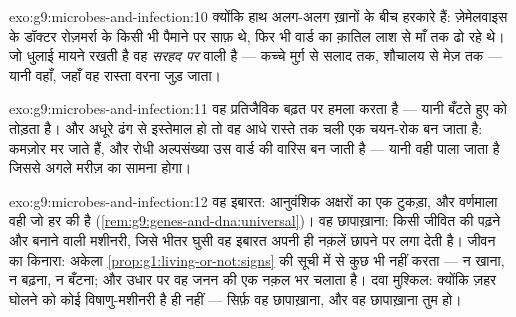 \begin{solution}{exo:g9:microbes-and-infection:10}
क्योंकि हाथ अलग-अलग ख़ानों के बीच हरकारे हैं: ज़ेमेलवाइस के डॉक्टर
रोज़मर्रा के किसी भी पैमाने पर साफ़ थे, फिर भी वार्ड का क़ातिल लाश से
माँ तक ढो रहे थे। जो धुलाई मायने रखती है वह \emph{सरहद पर} वाली है ---
कच्चे मुर्ग़ से सलाद तक, शौचालय से मेज़ तक --- यानी वहाँ, जहाँ वह रास्ता
वरना जुड़ जाता।
\end{solution}

\begin{solution}{exo:g9:microbes-and-infection:11}
वह प्रतिजैविक बढ़त पर हमला करता है --- यानी बँटते हुए  को तोड़ता
है। और अधूरे ढंग से इस्तेमाल हो तो वह आधे रास्ते तक चली एक चयन-रोक बन
जाता है: कमज़ोर मर जाते हैं, और रोधी अल्पसंख्या उस वार्ड की वारिस बन
जाती है --- यानी वही  पाला जाता है जिससे अगले मरीज़ का सामना होगा।
\end{solution}

\begin{solution}{exo:g9:microbes-and-infection:12}
वह इबारत: आनुवंशिक अक्षरों का एक टुकड़ा, और वर्णमाला वही जो हर  की
है (\cref{rem:g9:genes-and-dna:universal})। वह छापाख़ाना: किसी जीवित
 की पढ़ने और बनाने वाली मशीनरी, जिसे भीतर घुसी वह इबारत अपनी ही
नक़लें छापने पर लगा देती है। जीवन का किनारा: अकेला 
\cref{prop:g1:living-or-not:signs} की सूची में से कुछ भी नहीं करता ---
न खाना, न बढ़ना, न बँटना; और उधार पर वह जनन की एक नक़ल भर चलाता है। दवा
मुश्किल: क्योंकि ज़हर घोलने को कोई विषाणु-मशीनरी है ही नहीं --- सिर्फ़ वह
छापाख़ाना, और वह छापाख़ाना तुम हो।
\end{solution}

